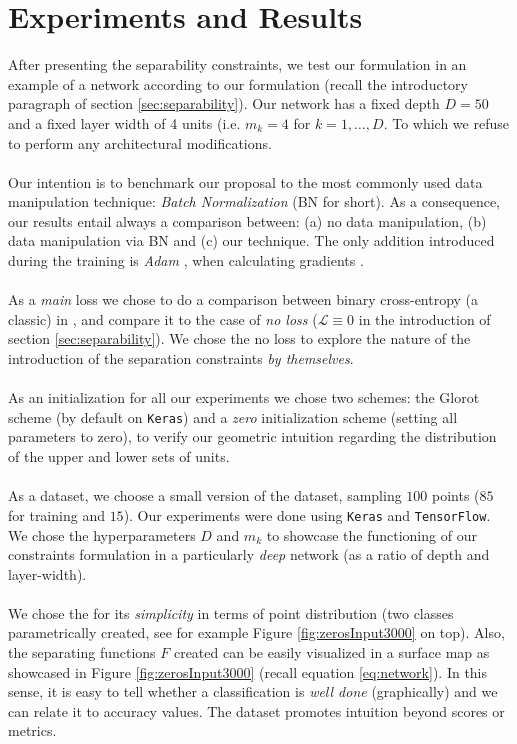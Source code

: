 \section{Experiments and Results}\label{sec:experiments}
After presenting the separability constraints, we test our formulation in an example of a network according to our formulation (recall the introductory paragraph of section \ref{sec:separability}). Our network has a fixed depth $D=50$ and a fixed layer width of 4 units (i.e. $m_k=4$ for $k=1,\ldots,D$. To which we refuse to perform any architectural modifications. 
\\\\
Our intention is to benchmark our proposal to the most commonly used data manipulation technique: \emph{Batch Normalization} (BN for short). As a consequence, our results entail always a comparison between: (a) no data manipulation, (b) data manipulation via BN and (c) our technique. The only addition introduced during the training is \emph{Adam} \cite{adam}, when calculating gradients \cite{Goodfellow-et-al-2016}.  
\\\\
As a \emph{main} loss we chose to do a comparison between binary cross-entropy (a classic) in \cite{LeCun06atutorial}, and compare it to the case of \emph{no loss} ($\mathcal{L}\equiv 0$ in the introduction of section \ref{sec:separability}). We chose the no loss to explore the nature of the introduction of the separation constraints \emph{by themselves}.     
\\\\
As an initialization for all our experiments we chose two schemes: the Glorot scheme \cite{Glorot10Initialization} (by default on \texttt{Keras}) and a \emph{zero} initialization scheme (setting all parameters to zero), to verify our geometric intuition regarding the distribution of the upper and lower sets of units.   
\\\\
As a dataset, we choose a small version of the \moons dataset, sampling $100$ points ($85$ for training and $15$). Our experiments were done using \texttt{Keras}\cite{keras} and \texttt{TensorFlow}\cite{tensorflow}. We chose the hyperparameters $D$ and $m_k$ to showcase the functioning of our constraints formulation in a particularly \emph{deep} network (as a ratio of depth and layer-width). 
\\\\
We chose the \moons for its \emph{simplicity} in terms of point distribution (two classes parametrically created, see for example Figure \ref{fig:zerosInput3000} on top). Also, the separating functions $F$ created can be easily visualized in a surface map as showcased in Figure \ref{fig:zerosInput3000} (recall equation \ref{eq:network}). In this sense, it is easy to tell whether a classification is \emph{well done} (graphically) and we can relate it to accuracy values. The \moons dataset promotes intuition beyond scores or metrics.  

